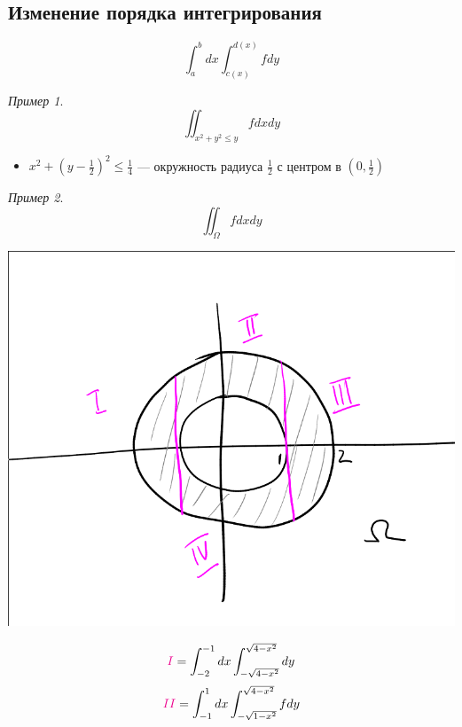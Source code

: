 \documentclass[english]{article}
\theoremstyle{plain}
\theoremstyle{remark}
\newtheorem*{examp}{Пример}
\theoremstyle{definition}
\begin{document}
\subsection{Изменение порядка интегрирования}
\label{sec:org9ea45a2}
\[ \int_a^b dx \int^{d(x)}_{c(x)} f dy  \]
\begin{examp}
\[ \iint_{x^2 + y^2 \le y} f dx dy \]
\begin{itemize}
\item \(x^2 + (y - \frac{1}{2})^2 \le \frac{1}{4}\) --- окружность радиуса \(\frac{1}{2}\) с центром в \((0, \frac{1}{2})\)
\end{itemize}
\end{examp}
\begin{examp}
\[ \iint_\Omega f dx dy \]
\begin{center}
\includegraphics[scale=0.35]{2_4.png}
\end{center}
\[ \color{magenta}I\color{black} = \int^{-1}_{-2} dx \int^{\sqrt{4 - x^2}}_{-\sqrt{4 - x^2}} dy \]
\[ \color{magenta}II\color{black} = \int^1_{-1}dx\int^{\sqrt{4 - x^2}}_{-\sqrt{1 - x^2}} f dy \]
\end{examp}
\end{document}
